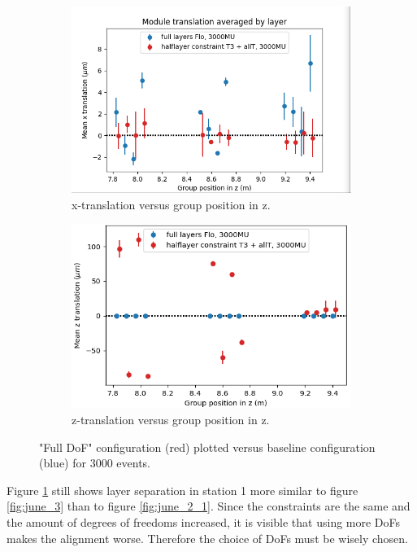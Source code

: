 \begin{figure}
  \centering
  \begin{subfigure}[b]{0.4\textwidth}
    \centering
    \includegraphics[width=\textwidth]{plots/june_21/allT_halfT3_Tx_vs_Flo.png}
    \caption{x-translation versus group position in z.}
    \label{fig:june_4_1}
  \end{subfigure}
  \hfill
  \begin{subfigure}[b]{0.4\textwidth}
    \centering
    \includegraphics[width=\textwidth]{plots/scatter_fig4_2.png}
    \caption{z-translation versus group position in z.}
    \label{fig:june_4_2}
  \end{subfigure}
  \caption{"Full DoF" configuration (red) plotted versus baseline configuration (blue) for 3000 events.}
  \label{fig:june_4}
\end{figure}

Figure \ref{fig:june_4_1} still shows layer separation in station 1 more similar to figure \ref{fig:june_3} than to figure \ref{fig:june_2_1}.
Since the constraints are the same and the amount of degrees of freedoms increased,
it is visible that using more DoFs makes the alignment worse. Therefore the choice of DoFs must be wisely chosen.

